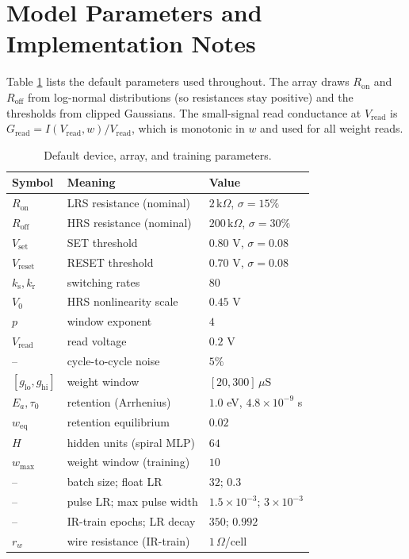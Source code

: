 \section{Model Parameters and Implementation Notes}
\label{app:params}
Table \ref{tab:params} lists the default parameters used throughout. The array
draws $R_\mathrm{on}$ and $R_\mathrm{off}$ from log-normal distributions (so
resistances stay positive) and the thresholds from clipped Gaussians. The
small-signal read conductance at $V_\mathrm{read}$ is
$G_\mathrm{read}=I(V_\mathrm{read},w)/V_\mathrm{read}$, which is monotonic in $w$
and used for all weight reads.

\begin{table}[h]
\caption{Default device, array, and training parameters.}
\label{tab:params}
\centering
\small
\begin{tabular}{lll}
\toprule
Symbol & Meaning & Value \\
\midrule
$R_\mathrm{on}$ & LRS resistance (nominal) & $2\,\mathrm{k}\Omega$, $\sigma{=}15\%$ \\
$R_\mathrm{off}$ & HRS resistance (nominal) & $200\,\mathrm{k}\Omega$, $\sigma{=}30\%$ \\
$V_\mathrm{set}$ & SET threshold & $0.80$ V, $\sigma{=}0.08$ \\
$V_\mathrm{reset}$ & RESET threshold & $0.70$ V, $\sigma{=}0.08$ \\
$k_\mathrm{s},k_\mathrm{r}$ & switching rates & $80$ \\
$V_0$ & HRS nonlinearity scale & $0.45$ V \\
$p$ & window exponent & $4$ \\
$V_\mathrm{read}$ & read voltage & $0.2$ V \\
-- & cycle-to-cycle noise & $5\%$ \\
$[g_\mathrm{lo},g_\mathrm{hi}]$ & weight window & $[20,300]\,\mu$S \\
$E_a,\tau_0$ & retention (Arrhenius) & $1.0$ eV, $4.8{\times}10^{-9}$ s \\
$w_\mathrm{eq}$ & retention equilibrium & $0.02$ \\
$H$ & hidden units (spiral MLP) & $64$ \\
$w_\mathrm{max}$ & weight window (training) & $10$ \\
-- & batch size; float LR & $32$; $0.3$ \\
-- & pulse LR; max pulse width & $1.5{\times}10^{-3}$; $3{\times}10^{-3}$ \\
-- & IR-train epochs; LR decay & $350$; $0.992$ \\
$r_w$ & wire resistance (IR-train) & $1\,\Omega$/cell \\
\bottomrule
\end{tabular}
\end{table}

